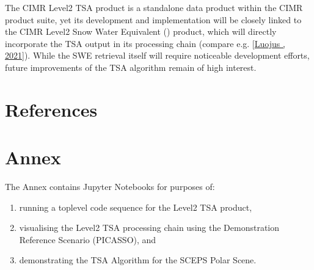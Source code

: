 \documentclass[letterpaper,10pt,english]{jupyterBook}
\begin{document}
\sphinxAtStartPar
The CIMR Level\sphinxhyphen{}2 TSA product is a stand\sphinxhyphen{}alone data product within the CIMR product suite, yet its development and implementation will be closely linked to the CIMR Level\sphinxhyphen{}2 Snow Water Equivalent ({\hyperref[\detokenize{book/acronyms:term-SWE}]{}}) product, which will directly incorporate the TSA output in its processing chain (compare e.g. {[}\hyperlink{cite.book/references:id22}{Luojus , 2021}{]}).
While the SWE retrieval itself will require noticeable development efforts, future improvements of the TSA algorithm remain of high interest.

\sphinxstepscope


\chapter{References}
\label{\detokenize{book/references:references}}\label{\detokenize{book/references::doc}}
\sphinxstepscope


\chapter{Annex}
\label{\detokenize{book/annex:annex}}\label{\detokenize{book/annex:content-annex}}\label{\detokenize{book/annex::doc}}
\sphinxAtStartPar
The Annex contains Jupyter Notebooks for purposes of:
\begin{enumerate}
%
\item {} 
\sphinxAtStartPar
running a top\sphinxhyphen{}level code sequence for the Level\sphinxhyphen{}2 TSA product,

\item {} 
\sphinxAtStartPar
visualising the Level\sphinxhyphen{}2 TSA processing chain using the Demonstration Reference Scenario (PICASSO), and

\item {} 
\sphinxAtStartPar
demonstrating the TSA Algorithm for the SCEPS Polar Scene.

\end{enumerate}

\sphinxstepscope
\end{document}
